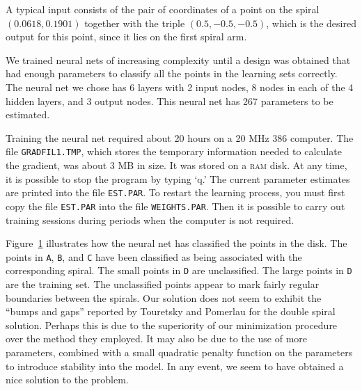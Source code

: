\documentclass{admbmanual}
\begin{document}
A typical input consists of the pair of coordinates of a point
on the spiral $(0.0618,0.1901)$ together
with the triple $(0.5,-0.5,-0.5)$, which is the desired output for 
this point, since it lies on the first spiral arm.

We trained neural nets of increasing complexity until a design 
was obtained that had enough parameters to classify all the points
in the learning sets correctly. The neural net we chose
has 6 layers with 2 input nodes, 8 nodes in each of the 4 hidden layers,
and 3 output nodes. This neural net has 267 parameters to be estimated.

Training the neural net required about 20 hours on a 20 MHz 386
computer. The file \texttt{GRADFIL1.TMP}, which stores the temporary
information needed to calculate the gradient, was about 3 MB in size.
It was stored on a \textsc{ram} disk. At any time, it is possible to stop
the program by typing `q.' The current parameter estimates
are printed into the file \texttt{EST.PAR}. To restart the learning
process, you must first copy the file \texttt{EST.PAR} into the
file \texttt{WEIGHTS.PAR}. Then it is possible to 
carry out training sessions during periods when the computer is not required.
\begin{figure}[h]
  \centering\hskip1pt
   
   \emptycaption{}
   \label{fig:description-nn-02} %
\end{figure}
Figure~\ref{fig:description-nn-02} %
illustrates how the neural net has classified the 
points in the disk. The points in \texttt{A}, \texttt{B}, and \texttt{C} have been classified
as being associated with the corresponding spiral. The small points in \texttt{D}
are unclassified. The large points in \texttt{D} are the training set. The unclassified 
points appear to mark fairly regular boundaries between the spirals. 
Our solution does not seem to exhibit the ``bumps and gaps''
reported by Touretsky and Pomerlau for the double spiral solution.
Perhaps this is due to the superiority of our minimization
procedure over the method they employed.
It may also be due to the use of more parameters, combined with a 
small quadratic penalty 
function on the parameters to introduce stability into the model.
In any event, we seem to have obtained a nice solution
to the problem.




\printindex  %
\end{document}
